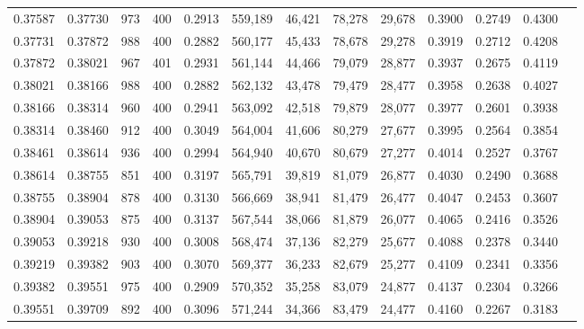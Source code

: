 \begin{tabular}{rrrrrrrrrrrrr}
0.37587 & 0.37730 &    973 & 400 &                                     0.2913 & 559,189 &  46,421 &  78,278 &  29,678 & 0.3900 & 0.2749 & 0.4300 \\
0.37731 & 0.37872 &    988 & 400 &                                     0.2882 & 560,177 &  45,433 &  78,678 &  29,278 & 0.3919 & 0.2712 & 0.4208 \\
0.37872 & 0.38021 &    967 & 401 &                                     0.2931 & 561,144 &  44,466 &  79,079 &  28,877 & 0.3937 & 0.2675 & 0.4119 \\
0.38021 & 0.38166 &    988 & 400 &                                     0.2882 & 562,132 &  43,478 &  79,479 &  28,477 & 0.3958 & 0.2638 & 0.4027 \\
0.38166 & 0.38314 &    960 & 400 &                                     0.2941 & 563,092 &  42,518 &  79,879 &  28,077 & 0.3977 & 0.2601 & 0.3938 \\
0.38314 & 0.38460 &    912 & 400 &                                     0.3049 & 564,004 &  41,606 &  80,279 &  27,677 & 0.3995 & 0.2564 & 0.3854 \\
0.38461 & 0.38614 &    936 & 400 &                                     0.2994 & 564,940 &  40,670 &  80,679 &  27,277 & 0.4014 & 0.2527 & 0.3767 \\
0.38614 & 0.38755 &    851 & 400 &                                     0.3197 & 565,791 &  39,819 &  81,079 &  26,877 & 0.4030 & 0.2490 & 0.3688 \\
0.38755 & 0.38904 &    878 & 400 &                                     0.3130 & 566,669 &  38,941 &  81,479 &  26,477 & 0.4047 & 0.2453 & 0.3607 \\
0.38904 & 0.39053 &    875 & 400 &                                     0.3137 & 567,544 &  38,066 &  81,879 &  26,077 & 0.4065 & 0.2416 & 0.3526 \\
0.39053 & 0.39218 &    930 & 400 &                                     0.3008 & 568,474 &  37,136 &  82,279 &  25,677 & 0.4088 & 0.2378 & 0.3440 \\
0.39219 & 0.39382 &    903 & 400 &                                     0.3070 & 569,377 &  36,233 &  82,679 &  25,277 & 0.4109 & 0.2341 & 0.3356 \\
0.39382 & 0.39551 &    975 & 400 &                                     0.2909 & 570,352 &  35,258 &  83,079 &  24,877 & 0.4137 & 0.2304 & 0.3266 \\
0.39551 & 0.39709 &    892 & 400 &                                     0.3096 & 571,244 &  34,366 &  83,479 &  24,477 & 0.4160 & 0.2267 & 0.3183 \\

\end{tabular}
